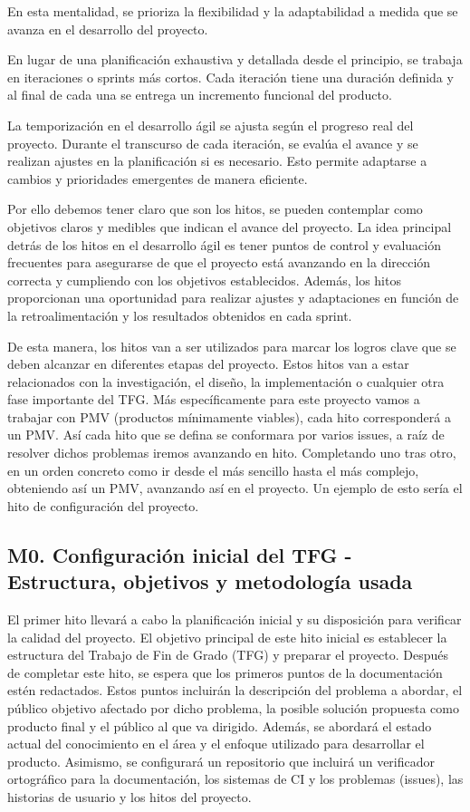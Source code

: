En esta mentalidad, se prioriza la flexibilidad y la adaptabilidad a medida que se avanza en el desarrollo del proyecto.

En lugar de una planificación exhaustiva y detallada desde el principio, se trabaja en iteraciones o sprints más cortos. Cada iteración tiene una duración definida y al final de cada una se entrega un incremento funcional del producto.

La temporización en el desarrollo ágil se ajusta según el progreso real del proyecto. Durante el transcurso de cada iteración, se evalúa el avance y se realizan ajustes en la planificación si es necesario. Esto permite adaptarse a cambios y prioridades emergentes de manera eficiente.

Por ello debemos tener claro que son los hitos, se pueden contemplar como objetivos claros y medibles que indican el avance del proyecto. La idea principal detrás de los hitos en el desarrollo ágil es tener puntos de control y evaluación frecuentes para asegurarse de que el proyecto está avanzando en la dirección correcta y cumpliendo con los objetivos establecidos. Además, los hitos proporcionan una oportunidad para realizar ajustes y adaptaciones en función de la retroalimentación y los resultados obtenidos en cada sprint. 

De esta manera, los hitos van a ser utilizados para marcar los logros clave que se deben alcanzar en diferentes etapas del proyecto. Estos hitos van a estar relacionados con la investigación, el diseño, la implementación o cualquier otra fase importante del TFG. Más específicamente para este proyecto vamos a trabajar con PMV (productos mínimamente viables), cada hito corresponderá a un PMV. Así cada hito que se defina se conformara por varios issues, a raíz de resolver dichos problemas iremos avanzando en hito. Completando uno tras otro, en un orden concreto como ir desde el más sencillo hasta el más complejo, obteniendo así un PMV, avanzando así en el proyecto. Un ejemplo de esto sería el hito de configuración del proyecto.

\subsection{M0. Configuración inicial del TFG - Estructura, objetivos y metodología usada}
El primer hito llevará a cabo la planificación inicial y su disposición para verificar la calidad del
proyecto.
El objetivo principal de este hito inicial es establecer la estructura del Trabajo de Fin de Grado (TFG) y preparar el proyecto. Después de completar este hito, se espera que los primeros puntos de la documentación estén redactados. Estos puntos incluirán la descripción del problema a abordar, el público objetivo afectado por dicho problema, la posible solución propuesta como producto final y el público al que va dirigido. Además, se abordará el estado actual del conocimiento en el área y el enfoque utilizado para desarrollar el producto. Asimismo, se configurará un repositorio que incluirá un verificador ortográfico para la documentación, los sistemas de CI y los problemas (issues), las historias de usuario y los hitos del proyecto.

